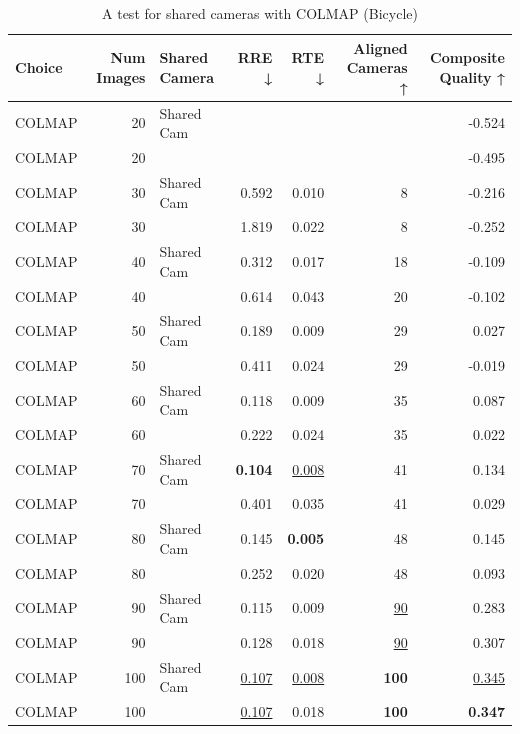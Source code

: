 \begin{table}[H]
\caption{A test for shared cameras with COLMAP (Bicycle)}
\label{tab:06_shared_camera_colmap_bicycle}
\begin{tabular}{lrlrrrr}
\toprule
Choice & Num Images & Shared Camera & RRE ↓ & RTE ↓ & Aligned Cameras ↑ & Composite Quality ↑ \\
\midrule
COLMAP & 20 & Shared Cam &  &  &  & -0.524 \\
COLMAP & 20 &  &  &  &  & -0.495 \\
COLMAP & 30 & Shared Cam & 0.592 & 0.010 & 8 & -0.216 \\
COLMAP & 30 &  & 1.819 & 0.022 & 8 & -0.252 \\
COLMAP & 40 & Shared Cam & 0.312 & 0.017 & 18 & -0.109 \\
COLMAP & 40 &  & 0.614 & 0.043 & 20 & -0.102 \\
COLMAP & 50 & Shared Cam & 0.189 & 0.009 & 29 & 0.027 \\
COLMAP & 50 &  & 0.411 & 0.024 & 29 & -0.019 \\
COLMAP & 60 & Shared Cam & 0.118 & 0.009 & 35 & 0.087 \\
COLMAP & 60 &  & 0.222 & 0.024 & 35 & 0.022 \\
COLMAP & 70 & Shared Cam & \textbf{0.104} & \underline{0.008} & 41 & 0.134 \\
COLMAP & 70 &  & 0.401 & 0.035 & 41 & 0.029 \\
COLMAP & 80 & Shared Cam & 0.145 & \textbf{0.005} & 48 & 0.145 \\
COLMAP & 80 &  & 0.252 & 0.020 & 48 & 0.093 \\
COLMAP & 90 & Shared Cam & 0.115 & 0.009 & \underline{90} & 0.283 \\
COLMAP & 90 &  & 0.128 & 0.018 & \underline{90} & 0.307 \\
COLMAP & 100 & Shared Cam & \underline{0.107} & \underline{0.008} & \textbf{100} & \underline{0.345} \\
COLMAP & 100 &  & \underline{0.107} & 0.018 & \textbf{100} & \textbf{0.347} \\
\bottomrule
\end{tabular}
\end{table}
